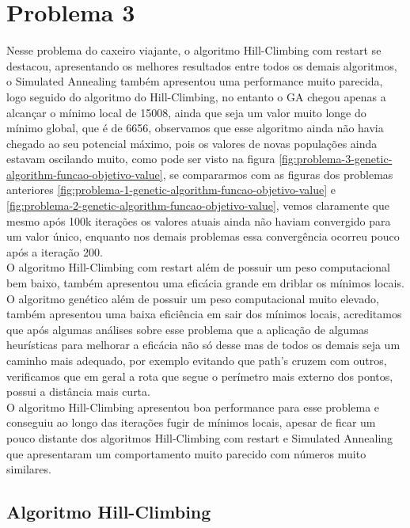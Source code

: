 \section[Problema 3]{Problema 3}

Nesse problema do caxeiro viajante, o algoritmo Hill-Climbing com restart se destacou, apresentando os melhores resultados entre todos os demais algoritmos, o Simulated Annealing também apresentou uma performance muito parecida, logo seguido do algoritmo do Hill-Climbing, no entanto o GA chegou apenas a alcançar o mínimo local de 15008, ainda que seja um valor muito longe do mínimo global, que é de 6656, observamos que esse algoritmo ainda não havia chegado ao seu potencial máximo, pois os valores de novas populações ainda estavam oscilando muito, como pode ser visto na figura \ref{fig:problema-3-genetic-algorithm-funcao-objetivo-value}, se compararmos com as figuras dos problemas anteriores \ref{fig:problema-1-genetic-algorithm-funcao-objetivo-value} e \ref{fig:problema-2-genetic-algorithm-funcao-objetivo-value}, vemos claramente que mesmo após 100k iterações os valores atuais ainda não haviam convergido para um valor único, enquanto nos demais problemas essa convergência ocorreu pouco após a iteração 200. \\

O algoritmo Hill-Climbing com restart além de possuir um peso computacional bem baixo, também apresentou uma eficácia grande em driblar os mínimos locais. O algoritmo genético além de possuir um peso computacional muito elevado, também apresentou uma baixa eficiência em sair dos mínimos locais, acreditamos que após algumas análises sobre esse problema que a aplicação de algumas heurísticas para melhorar a eficácia não só desse mas de todos os demais seja um caminho mais adequado, por exemplo evitando que path's cruzem com outros, verificamos que em geral a rota que segue o perímetro mais externo dos pontos, possui a distância mais curta. \\

O algoritmo Hill-Climbing apresentou boa performance para esse problema e conseguiu ao longo das iterações fugir de mínimos locais, apesar de ficar um pouco distante dos algoritmos Hill-Climbing com restart e Simulated Annealing que apresentaram um comportamento muito parecido com números muito similares. \\

\subsection{Algoritmo Hill-Climbing}

